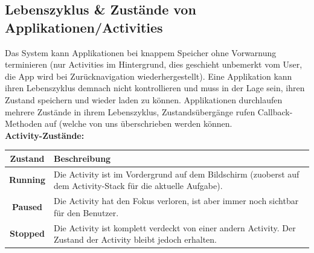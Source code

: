 \documentclass[a4paper]{article}
\begin{document}
	\subsection{Lebenszyklus \& Zustände von Applikationen/Activities}
	Das System kann Applikationen bei knappem Speicher ohne Vorwarnung terminieren (nur Activities im Hintergrund, dies geschieht unbemerkt vom User, die App wird bei Zurücknavigation wiederhergestellt). Eine Applikation kann ihren Lebenszyklus demnach nicht kontrollieren und muss in der Lage sein, ihren Zustand speichern und wieder laden zu können. Applikationen durchlaufen mehrere Zustände in ihrem Lebenszyklus, Zustandsübergänge rufen Callback-Methoden auf (welche von uns überschrieben werden können.\\
	
	\noindent
	\textbf{Activity-Zustände:}
	\begin{table} [h!]
		\begin{tabular}{ c | p{10cm} }
			\textbf{Zustand} & \textbf{Beschreibung} \\ \hline
			\textbf{Running} & Die Activity ist im Vordergrund auf dem Bildschirm (zuoberst auf dem Activity-Stack für die aktuelle Aufgabe). \\ \hline
			\textbf{Paused} & Die Activity hat den Fokus verloren, ist aber immer noch sichtbar für den Benutzer. \\ \hline
			\textbf{Stopped} & Die Activity ist komplett verdeckt von einer andern Activity. Der Zustand der Activity bleibt jedoch erhalten.
		\end{tabular}
	\end{table}
	\newpage
\end{document}
